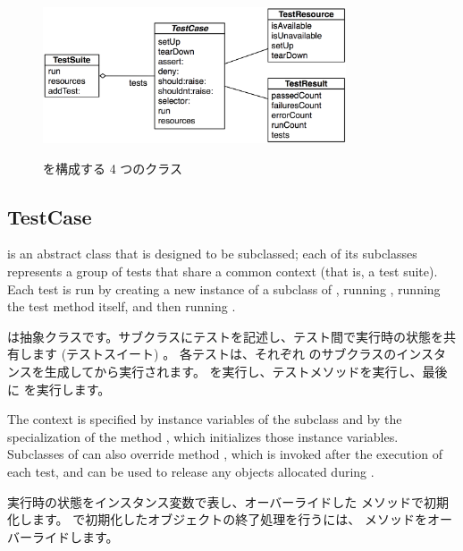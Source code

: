 \documentclass[a4paper,10pt,twoside]{book}
\begin{document}
{\begin{figure}[htb]
  \begin{center}
		{\includegraphics[width=0.8\textwidth]{sunit-classes}}
	\caption{\SUnit を構成する 4 つのクラス}
  \end{center}
\end{figure}


\subsection{TestCase}

 is an abstract class that is designed to be subclassed; each of its subclasses represents a group of tests that share a common context (that is, a test suite).
Each test is run by creating a new instance of a subclass of ,
running , running the test method itself, and then running .
\fi

 は抽象クラスです。サブクラスにテストを記述し、テスト間で実行時の状態を共有します (テストスイート) 。
各テストは、それぞれ  のサブクラスのインスタンスを生成してから実行されます。  を実行し、テストメソッドを実行し、最後に  を実行します。

The context is specified
by instance variables of the subclass
and by the specialization of the method
, which initializes those instance variables.
Subclasses of  can also override method
, which is invoked after the execution of each test,
and can be used to release any objects
allocated during .
\fi

実行時の状態をインスタンス変数で表し、オーバーライドした  メソッドで初期化します。  で初期化したオブジェクトの終了処理を行うには、  メソッドをオーバーライドします。

}
\end{document}

